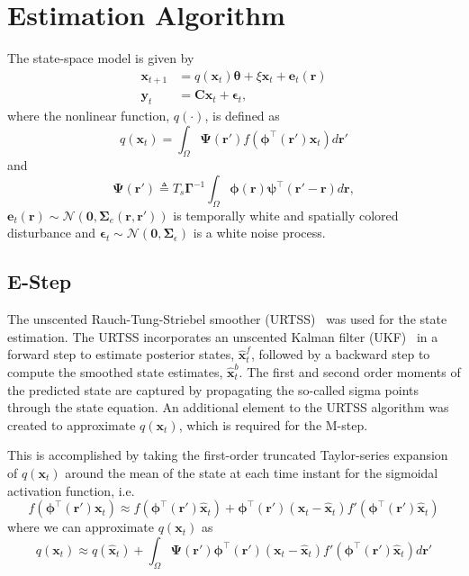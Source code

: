 \documentclass[]{article}
\begin{document}
\section{Estimation Algorithm}
The state-space model is given by
\begin{align}
 \mathbf x_{t+1}&=q(\mathbf x_t)\boldsymbol\theta+\xi \mathbf x_t+\boldsymbol e_t(\mathbf r) \\
 \mathbf y_t&=\mathbf C \mathbf x_t+\boldsymbol \epsilon_t,
\end{align}
where the nonlinear function, $q(\cdot)$, is defined as
\begin{equation}\label{eq:QmatrixForSigmapoints}
	q(\mathbf{x}_t) = \int_\Omega \boldsymbol{\Psi}(\mathbf{r}') f(\boldsymbol{\phi}^{\top}(\mathbf{r}')\mathbf{x}_t) d\mathbf{r}'
\end{equation}
and
\begin{equation}\label{eq:DefPsi}
	\boldsymbol{\Psi}(\mathbf{r}') \triangleq T_s\boldsymbol{\Gamma}^{-1}\int_\Omega {\boldsymbol{\phi}(\mathbf{r})\boldsymbol{\psi}^{\top} (\mathbf{r}'-\mathbf{r})d\mathbf{r}},
\end{equation}
$ \boldsymbol e_t(\mathbf r)\sim \mathcal N(\mathbf 0,\boldsymbol\Sigma_e(\mathbf r,\mathbf r'))$ is temporally white and spatially colored disturbance and  $\boldsymbol\epsilon_t\sim \mathcal N(\mathbf 0,\boldsymbol\Sigma_{\epsilon})$ is a white noise process.

\subsection{E-Step}
The unscented Rauch-Tung-Striebel smoother (URTSS)~\cite{Sarkka2010} was used for the state estimation. The URTSS incorporates an unscented Kalman filter (UKF)~\cite{Julier1997, Merwe2003} in a forward step to estimate posterior states, $\hat{\mathbf x}_t^{f}$, followed by a backward step to compute the smoothed state estimates, $\hat{\mathbf x}_t^{b}$. The first and second order moments of the predicted state are captured by propagating the so-called sigma points through the state equation. An additional element to the URTSS algorithm was created to approximate $q(\mathbf{x}_t)$, which is required for the M-step. 

This is accomplished by taking the first-order truncated Taylor-series expansion of $q(\mathbf x_t)$ around the mean of the state at each time instant for the sigmoidal activation function, i.e.
\begin{equation}
 f(\boldsymbol \phi^\top(\mathbf r')\mathbf x_t) \approx f(\boldsymbol \phi^\top(\mathbf r')\mathbf {\hat x}_t)+  \boldsymbol \phi^\top(\mathbf r')(\mathbf x_t - \mathbf  {\hat x}_t)f'(\boldsymbol \phi^\top(\mathbf r')\mathbf {\hat x}_t)
\end{equation}
where we can approximate $q(\mathbf x_t)$ as
\begin{equation}\label{eq:qTaylor}
 q(\mathbf x_t) \approx q(\mathbf {\hat x}_t)+\int_\Omega \boldsymbol{\Psi}(\mathbf{r}')\boldsymbol \phi^\top(\mathbf r') (\mathbf x_t - \mathbf  {\hat x}_t)f'(\boldsymbol \phi^\top(\mathbf r')\mathbf {\hat x}_t) d\mathbf{r}'
\end{equation}
\end{document}
